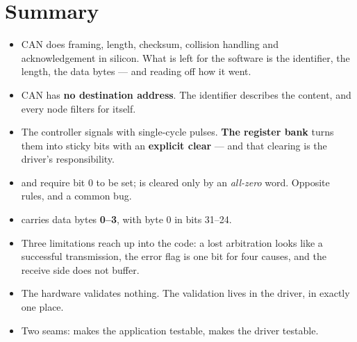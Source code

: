 \section*{Summary}

\begin{itemize}
  \item CAN does framing, length, checksum, collision handling and acknowledgement in silicon.
    What is left for the software is the identifier, the length, the data bytes --- and reading
    off how it went.
  \item CAN has \textbf{no destination address}. The identifier describes the content, and every
    node filters for itself.
  \item The controller signals with single-cycle pulses. \textbf{The register bank} turns them
    into sticky bits with an \textbf{explicit clear} --- and that clearing is the driver's
    responsibility.
  \item {} and  require bit 0 to be set;  is cleared
    only by an \emph{all-zero} word. Opposite rules, and a common bug.
  \item {} carries data bytes \textbf{0--3}, with byte 0 in bits 31--24.
  \item Three limitations reach up into the code: a lost arbitration looks like a successful
    transmission, the error flag is one bit for four causes, and the receive side does not buffer.
  \item The hardware validates nothing. The validation lives in the driver, in exactly one place.
  \item Two seams:  makes the application testable,  makes the
    driver testable.
\end{itemize}
